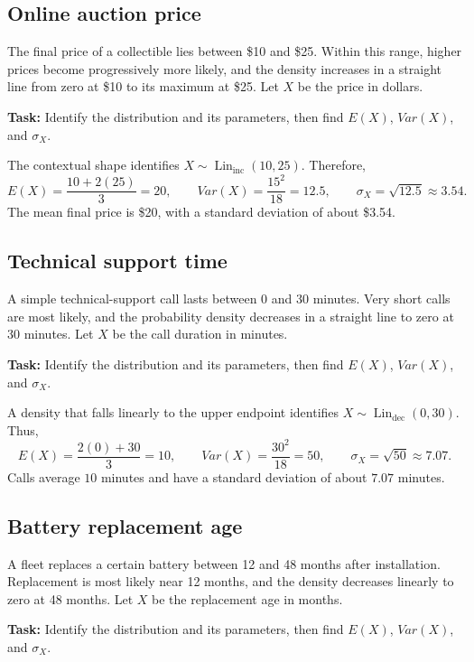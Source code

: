 \subsection{Online auction price}\label{sec:c4-context-auction}
The final price of a collectible lies between \$10 and \$25. Within this range,
higher prices become progressively more likely, and the density increases in a
straight line from zero at \$10 to its maximum at \$25. Let $X$ be the price in
dollars.

\textbf{Task:} Identify the distribution and its parameters, then find
$E(X)$, $Var(X)$, and $\sigma_X$.

The contextual shape identifies
$X\sim\operatorname{Lin}_{\mathrm{inc}}(10,25)$. Therefore,
\[
E(X)=\frac{10+2(25)}{3}=20,\qquad
Var(X)=\frac{15^2}{18}=12.5,\qquad
\sigma_X=\sqrt{12.5}\approx3.54.
\]
The mean final price is \$20, with a standard deviation of about \$3.54.

\subsection{Technical support time}\label{sec:c4-context-support}
A simple technical-support call lasts between 0 and 30 minutes. Very short calls
are most likely, and the probability density decreases in a straight line to
zero at 30 minutes. Let $X$ be the call duration in minutes.

\textbf{Task:} Identify the distribution and its parameters, then find
$E(X)$, $Var(X)$, and $\sigma_X$.

A density that falls linearly to the upper endpoint identifies
$X\sim\operatorname{Lin}_{\mathrm{dec}}(0,30)$. Thus,
\[
E(X)=\frac{2(0)+30}{3}=10,\qquad
Var(X)=\frac{30^2}{18}=50,\qquad
\sigma_X=\sqrt{50}\approx7.07.
\]
Calls average $10$ minutes and have a standard deviation of about $7.07$
minutes.

\subsection{Battery replacement age}\label{sec:c4-context-battery}
A fleet replaces a certain battery between 12 and 48 months after installation.
Replacement is most likely near 12 months, and the density decreases linearly
to zero at 48 months. Let $X$ be the replacement age in months.

\textbf{Task:} Identify the distribution and its parameters, then find
$E(X)$, $Var(X)$, and $\sigma_X$.

